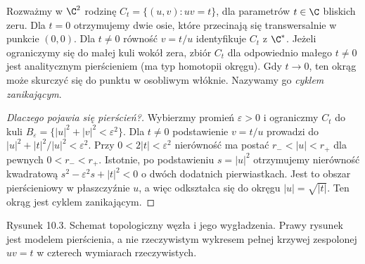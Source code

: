 \begin{przyklad}
\label{prz:ga10-node}
Rozważmy w $\C^2$ rodzinę $C_t=\{(u,v):uv=t\}$,
dla parametrów $t\in\C$ bliskich zeru.
Dla $t=0$ otrzymujemy dwie osie, które przecinają się
transwersalnie w punkcie $(0,0)$. Dla $t\ne0$
równość $v=t/u$ identyfikuje $C_t$ z $\C^*$.
Jeżeli ograniczymy się do małej kuli wokół zera,
zbiór $C_t$ dla odpowiednio małego $t\ne0$ jest
analitycznym pierścieniem (ma typ homotopii okręgu).
Gdy $t\to0$, ten okrąg może skurczyć się do punktu
w osobliwym włóknie. Nazywamy go \emph{cyklem zanikającym}.
\end{przyklad}

\begin{proof}[Dlaczego pojawia się pierścień?]
Wybierzmy promień $\varepsilon>0$ i ograniczmy $C_t$
do kuli $B_\varepsilon=\{|u|^2+|v|^2<\varepsilon^2\}$.
Dla $t\ne0$ podstawienie $v=t/u$ prowadzi do
$|u|^2+|t|^2/|u|^2<\varepsilon^2$.
Przy $0<2|t|<\varepsilon^2$ nierówność ma postać
$r_-<|u|<r_+$ dla pewnych $0<r_-<r_+$.
Istotnie, po podstawieniu $s=|u|^2$ otrzymujemy
nierówność kwadratową $s^2-\varepsilon^2s+|t|^2<0$
o dwóch dodatnich pierwiastkach.
Jest to obszar pierścieniowy w płaszczyźnie $u$,
a więc odkształca się do okręgu $|u|=\sqrt{|t|}$.
Ten okrąg jest cyklem zanikającym.
\end{proof}

\begin{center}

{\small Rysunek 10.3. Schemat topologiczny węzła i jego wygładzenia.
Prawy rysunek jest modelem pierścienia, a nie rzeczywistym wykresem
pełnej krzywej zespolonej $uv=t$ w czterech wymiarach rzeczywistych.}\par
\end{center}

